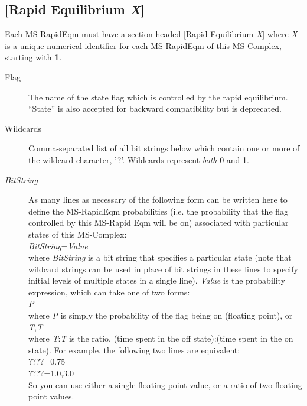 \subsection{[Rapid Equilibrium \emph{X}]}
Each MS-RapidEqm must have a section headed [Rapid Equilibrium
\emph{X}] where \emph{X} is a unique numerical identifier for each
MS-RapidEqm of this MS-Complex, starting with \textbf{1}.

\begin{description}
\item[Flag] The name of the state flag which is controlled by the
  rapid equilibrium. ``State'' is also accepted for backward compatibility but
  is deprecated.
  
\item[Wildcards] Comma-separated list of all bit strings below which
  contain one or more of the wildcard character, '?'. Wildcards
  represent \emph{both} 0 and 1.
       
\item[\emph{BitString}] As many lines as necessary of the following
  form can be written here to define the MS-RapidEqm probabilities
  (i.e. the probability that the flag controlled by this MS-Rapid Eqm
  will be on)
  associated with particular states of this MS-Complex:\\[\baselineskip]
  \emph{BitString}=\emph{Value}
  \\[\baselineskip]
  where \emph{BitString} is a bit string that specifies a particular
  state (note that wildcard strings can be used in place of bit
  strings in these lines to specify initial levels of multiple states
  in a single line).  \emph{Value} is the probability expression,
  which can take one of two forms:\\[\baselineskip]
  \emph{P}\\[\baselineskip]
  where \emph{P} is simply the probability of the flag
  being on (floating point), or\\[\baselineskip]
  \emph{T},\emph{T}\\[\baselineskip]
  where \emph{T}:\emph{T} is the ratio, (time
  spent in the off state):(time spent in the on state).  For
  example, the following two lines are equivalent:\\[\baselineskip]
  ????=0.75\\[\baselineskip]
  ????=1.0,3.0\\[\baselineskip]
  So you can use either a single floating point value, or a ratio of
  two floating point values.

\end{description}

